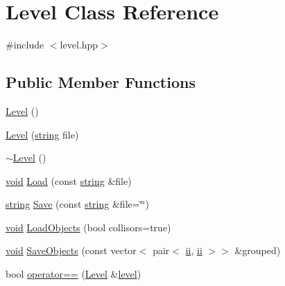 \hypertarget{class_level}{\section{Level Class Reference}
\label{class_level}
}


{\ttfamily \#include $<$level.\-hpp$>$}

\subsection*{Public Member Functions}
\begin{DoxyCompactItemize}
\item 
\hyperlink{class_level_a7a696c928ca5d5354db6e50e46d0f67d}{Level} ()
\item 
\hyperlink{class_level_af539d2e616a7b7b3e371f43bee672ed3}{Level} (\hyperlink{_s_d_l__opengl__glext_8h_ae84541b4f3d8e1ea24ec0f466a8c568b}{string} file)
\item 
\hyperlink{class_level_a249eac1e8f19ff44134efa5e986feaca}{$\sim$\-Level} ()
\item 
\hyperlink{_s_d_l__opengles2__gl2ext_8h_ae5d8fa23ad07c48bb609509eae494c95}{void} \hyperlink{class_level_ab51ca551c11506164e5de7158999a719}{Load} (const \hyperlink{_s_d_l__opengl__glext_8h_ae84541b4f3d8e1ea24ec0f466a8c568b}{string} \&file)
\item 
\hyperlink{_s_d_l__opengl__glext_8h_ae84541b4f3d8e1ea24ec0f466a8c568b}{string} \hyperlink{class_level_a73328f4e7d28e9ae886fdb6ff2431b84}{Save} (const \hyperlink{_s_d_l__opengl__glext_8h_ae84541b4f3d8e1ea24ec0f466a8c568b}{string} \&file=\char`\"{}\char`\"{})
\item 
\hyperlink{_s_d_l__opengles2__gl2ext_8h_ae5d8fa23ad07c48bb609509eae494c95}{void} \hyperlink{class_level_a52aa53d02596b02923e6393b6ad3c1a6}{Load\-Objects} (bool collisors=true)
\item 
\hyperlink{_s_d_l__opengles2__gl2ext_8h_ae5d8fa23ad07c48bb609509eae494c95}{void} \hyperlink{class_level_ab8e0f3a3ef6fe4f8b7f1b6d869844779}{Save\-Objects} (const vector$<$ pair$<$ \hyperlink{common_8hpp_a45680061f7e655744e42cdfa30b44fa8}{ii}, \hyperlink{common_8hpp_a45680061f7e655744e42cdfa30b44fa8}{ii} $>$$>$ \&grouped)
\item 
bool \hyperlink{class_level_a740a8c73b7200538fcd024c121dc227d}{operator==} (\hyperlink{class_level}{Level} \&\hyperlink{_s_d_l__opengl_8h_a2b536fca24f51d6a849aed325793e661}{level})
\end{DoxyCompactItemize}
